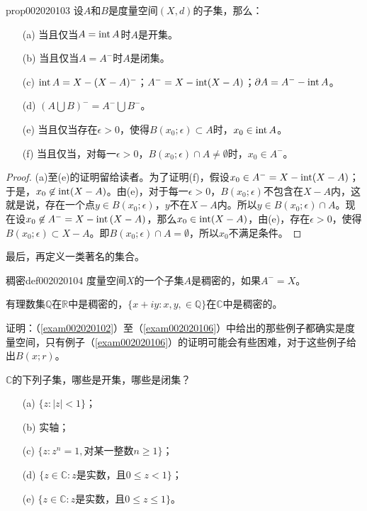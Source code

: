 \begin{proposition}{}{prop002020103}
设$A$和$B$是度量空间$(X, d)$的子集，那么：
\begin{enumerate}
\item[(a)]当且仅当$A = \operatorname{int}{A}$时$A$是开集。
\item[(b)]当且仅当$A = A^-$时$A$是闭集。
\item[(c)]$\operatorname{int}{A} = X - (X-A)^-$；$A^- = X- \operatorname{int}(X-A)$；$\partial{A} = A^- - \operatorname{int}{A}$。
\item[(d)]$(A \bigcup B)^- = A^- \bigcup B^-$。
\item[(e)]当且仅当存在$\epsilon > 0$，使得$B(x_0; \epsilon) \subset A$时，$x_0 \in \operatorname{int}{A}$。
\item[(f)]当且仅当，对每一$\epsilon > 0$，$B(x_0; \epsilon) \cap A \neq \emptyset$时，$x_0 \in A^-$。
\end{enumerate}
\end{proposition}
\begin{proof}
(a)至(e)的证明留给读者。为了证明(f)，假设$x_0 \in A^- = X - \operatorname{int}(X-A)$；于是，$x_0 \not\in \operatorname{int}(X-A)$。由(e)，对于每一$\epsilon > 0$，$B(x_0; \epsilon)$不包含在$X-A$内，这就是说，存在一个点$y \in B(x_0; \epsilon)$，$y$不在$X-A$内。所以$y \in B(x_0;\epsilon) \cap A$。现在设$x_0 \not\in A^- = X - \operatorname{int}{(X-A)}$，那么$x_0 \in \operatorname{int}(X-A)$，由(e)，存在$\epsilon > 0$，使得$B(x_0; \epsilon) \subset X-A$。即$B(x_0; \epsilon) \cap A = \emptyset$，所以$x_0$不满足条件。
\end{proof}

最后，再定义一类著名的集合。

\begin{definition}{稠密}{def002020104}
度量空间$X$的一个子集$A$是稠密的，如果$A^- = X$。
\end{definition}

有理数集$\mathbb{Q}$在$\mathbb{R}$中是稠密的，$\{x + iy : x, y, \in \mathbb{Q}\}$在$\mathbb{C}$中是稠密的。

\begin{exercise}
证明：（\ref{exam002020102}）至（\ref{exam002020106}）中给出的那些例子都确实是度量空间，只有例子（\ref{exam002020106}）的证明可能会有些困难，对于这些例子给出$B(x;r)$。
\end{exercise}

\begin{exercise}
$\mathbb{C}$的下列子集，哪些是开集，哪些是闭集？
\begin{enumerate}
\item[(a)]$\{z:|z|<1\}$；
\item[(b)]实轴；
\item[(c)]$\{z: z^n=1,\text{对某一整数}n \ge 1\}$；
\item[(d)]$\{z \in \mathbb{C}: z\text{是实数，且}0 \le z <1\}$；
\item[(e)]$\{z \in \mathbb{C}: z\text{是实数，且}0 \le z \le 1\}$。
\end{enumerate}
\end{exercise}

